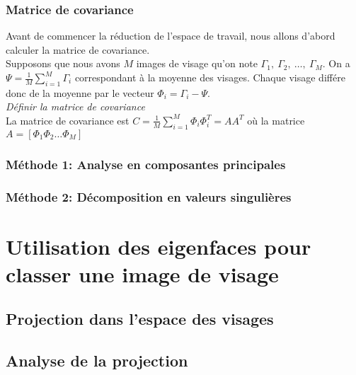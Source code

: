 \documentclass[12pt,french]{article}
\begin{document}
\subsubsection{Matrice de covariance}
Avant de commencer la réduction de l'espace de travail, nous allons d'abord calculer la matrice de covariance.\\
Supposons que nous avons $M$ images de visage qu'on note $\Gamma_1,~\Gamma_2,~\dots,~\Gamma_M$. On a $\Psi = \frac{1}{M}\displaystyle\sum_{i=1}^{M} \Gamma_i$ correspondant à la moyenne des visages.
Chaque visage différe donc de la moyenne par le vecteur $\Phi_i = \Gamma_i - \Psi$.
\\ \emph{Définir la matrice de covariance}\\
La matrice de covariance est $C = \frac{1}{M}\displaystyle\sum_{i=1}^{M} \Phi_i \Phi_i^T=AA^T$ où la matrice $A = [\Phi_1 \Phi_2 \dots \Phi_M]$

\subsubsection{Méthode 1: Analyse en composantes principales}
\subsubsection{Méthode 2: Décomposition en valeurs singulières}
\section{Utilisation des eigenfaces pour classer une image de visage}
\subsection{Projection dans l'espace des visages}
\subsection{Analyse de la projection}
\end{document}
